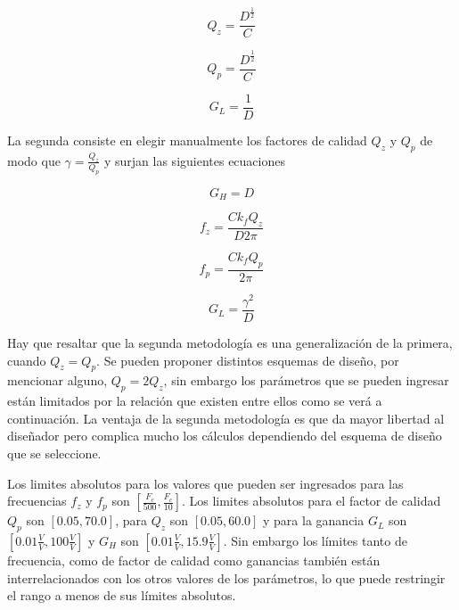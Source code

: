 	\begin{equation}
		Q_{z} = \frac{D^{\frac{1}{2}}}{C}
	\end{equation}
	
	\begin{equation}
		Q_{p} = \frac{D^{\frac{1}{2}}}{C}	
	\end{equation}
	
	\begin{equation}
		G_{L} = \frac{1}{D}
	\end{equation}
		
	La segunda consiste en elegir manualmente los factores de calidad $Q_{z}$ y $Q_{p}$ de modo que $\displaystyle{\gamma = \frac{Q_{z}}{Q_{p}}}$ y surjan las siguientes ecuaciones
		
	\begin{equation}
		G_{H} = D
	\end{equation}
	
	\begin{equation}
		f_{z} = \frac{C k_{f} Q_{z}}{D 2 \pi}	
	\end{equation}
	
	\begin{equation}
		f_{p} = \frac{C k_{f} Q_{p}}{ 2 \pi}	
	\end{equation}
	
	\begin{equation}
		G_{L} = \frac{\gamma^{2}}{D}
	\end{equation}
	
	Hay que resaltar que la segunda metodología es una generalización de la primera, cuando $Q_{z} = Q_{p}$. Se pueden proponer distintos esquemas de diseño, por mencionar alguno, $Q_{p} = 2Q_{z}$, sin embargo los parámetros que se pueden ingresar están limitados por la relación que existen entre ellos como se verá a continuación. La ventaja de la segunda metodología es que da mayor libertad al diseñador pero complica mucho los cálculos dependiendo del esquema de diseño que se seleccione.
		
	Los limites absolutos para los valores que pueden ser ingresados para las frecuencias $f_{z}$ y $f_{p}$ son $[\frac{F_{c}}{500}, \frac{F_{c}}{10}]$. Los limites absolutos para el factor de calidad $Q_{p}$ son $[0.05, 70.0]$, para $Q_{z}$ son $[0.05, 60.0]$ y para la ganancia $G_{L}$ son $[0.01\frac{V}{V}, 100\frac{V}{V}]$ y $G_{H}$ son $[0.01\frac{V}{V}, 15.9\frac{V}{V}]$.  Sin embargo los límites tanto de frecuencia, como de factor de calidad como ganancias también están interrelacionados con los otros valores de los parámetros, lo que puede restringir el rango a menos de sus límites absolutos. 
	
